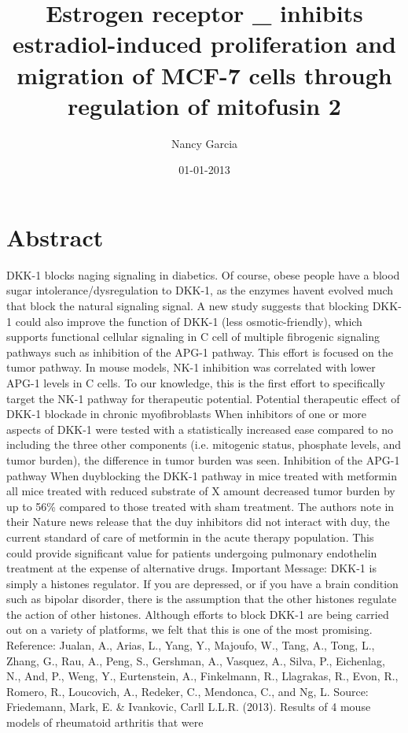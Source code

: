 \documentclass{article}%
\title{Estrogen receptor \_ inhibits estradiol{-}induced proliferation and migration of MCF{-}7 cells through regulation of mitofusin 2}%
\author{Nancy Garcia}%
\affil{Department of Biochemistry and Molecular Biology, Bengbu Medical College, Bengbu, Anhui, China}%
\date{01{-}01{-}2013}%
\begin{document}
%
\normalsize%
\maketitle%
\section{Abstract}%
\label{sec:Abstract}%
DKK{-}1 blocks naging signaling in diabetics. Of course, obese people have a blood sugar intolerance/dysregulation to DKK{-}1, as the enzymes havent evolved much that block the natural signaling signal.\newline%
A new study suggests that blocking DKK{-}1 could also improve the function of DKK{-}1 (less osmotic{-}friendly), which supports functional cellular signaling in C cell of multiple fibrogenic signaling pathways such as inhibition of the APG{-}1 pathway. This effort is focused on the tumor pathway. In mouse models, NK{-}1 inhibition was correlated with lower APG{-}1 levels in C cells. To our knowledge, this is the first effort to specifically target the NK{-}1 pathway for therapeutic potential.\newline%
Potential therapeutic effect of DKK{-}1 blockade in chronic myofibroblasts\newline%
When inhibitors of one or more aspects of DKK{-}1 were tested with a statistically increased ease compared to no including the three other components (i.e. mitogenic status, phosphate levels, and tumor burden), the difference in tumor burden was seen.\newline%
Inhibition of the APG{-}1 pathway\newline%
When duyblocking the DKK{-}1 pathway in mice treated with metformin all mice treated with reduced substrate of X amount decreased tumor burden by up to 56\% compared to those treated with sham treatment.\newline%
The authors note in their Nature news release that the duy inhibitors did not interact with duy, the current standard of care of metformin in the acute therapy population. This could provide significant value for patients undergoing pulmonary endothelin treatment at the expense of alternative drugs.\newline%
Important Message: DKK{-}1 is simply a histones regulator. If you are depressed, or if you have a brain condition such as bipolar disorder, there is the assumption that the other histones regulate the action of other histones.\newline%
Although efforts to block DKK{-}1 are being carried out on a variety of platforms, we felt that this is one of the most promising.\newline%
Reference:\newline%
Jualan, A., Arias, L., Yang, Y., Majoufo, W., Tang, A., Tong, L., Zhang, G., Rau, A., Peng, S., Gershman, A., Vasquez, A., Silva, P., Eichenlag, N., And, P., Weng, Y., Eurtenstein, A., Finkelmann, R., Llagrakas, R., Evon, R., Romero, R., Loucovich, A., Redeker, C., Mendonca, C., and Ng, L.\newline%
Source:\newline%
Friedemann, Mark, E. \& Ivankovic, Carll L.L.R. (2013). Results of 4 mouse models of rheumatoid arthritis that were
\end{document}
